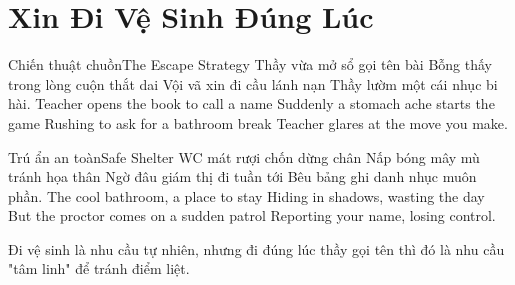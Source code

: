 \chapter{Xin Đi Vệ Sinh Đúng Lúc}

\begin{tutuyetbox}{Chiến thuật chuồn}{The Escape Strategy}
Thầy vừa mở sổ gọi tên bài
Bỗng thấy trong lòng cuộn thắt dai
Vội vã xin đi cầu lánh nạn
Thầy lườm một cái nhục bi hài.
\tcblower
Teacher opens the book to call a name 
Suddenly a stomach ache starts the game 
Rushing to ask for a bathroom break 
Teacher glares at the move you make.
\end{tutuyetbox}

\begin{tutuyetbox}{Trú ẩn an toàn}{Safe Shelter}
WC mát rượi chốn dừng chân
Nấp bóng mây mù tránh họa thân
Ngờ đâu giám thị đi tuần tới
Bêu bảng ghi danh nhục muôn phần.
\tcblower
The cool bathroom, a place to stay 
Hiding in shadows, wasting the day 
But the proctor comes on a sudden patrol 
Reporting your name, losing control.
\end{tutuyetbox}

\begin{ghichu}
Đi vệ sinh là nhu cầu tự nhiên, nhưng đi đúng lúc thầy gọi tên thì đó là nhu cầu "tâm linh" để tránh điểm liệt.
\end{ghichu}